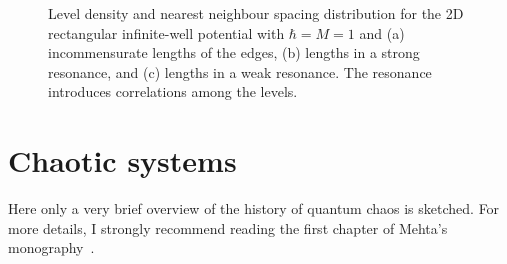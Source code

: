 \documentclass[a4paper,11pt,twoside]{article}
\begin{document}
\begin{solution}
            \begin{figure}[!htbp]
                \begin{subfigure}{0.49\linewidth}
                    \centering{}
                \end{subfigure}
                \hfill
                \begin{subfigure}{0.49\linewidth}
                    \centering{}
                \end{subfigure}
                \begin{subfigure}{0.49\linewidth}
                    \centering{}
                \end{subfigure}
                \hfill
                \begin{subfigure}{0.49\linewidth}
                    \centering{}
                \end{subfigure}
                \hfill
                \begin{subfigure}{0.98\linewidth}
                    \centering{}
                \end{subfigure}
                \hfill
                \caption{
                    \protect\small
                    Level density and nearest neighbour spacing distribution for the 2D rectangular infinite-well potential with $\hbar=M=1$ and (a) incommensurate lengths of the edges, (b) lengths in a strong resonance, and (c) lengths in a weak resonance.
                    The resonance introduces correlations among the levels.
                }	
                \label{fig:2Dbox}
            \end{figure}

        \end{solution}

\section{Chaotic systems}
    Here only a very brief overview of the history of quantum chaos is sketched.
    For more details, I strongly recommend reading the first chapter of Mehta's monography~\cite{Meh04}.
\end{document}
